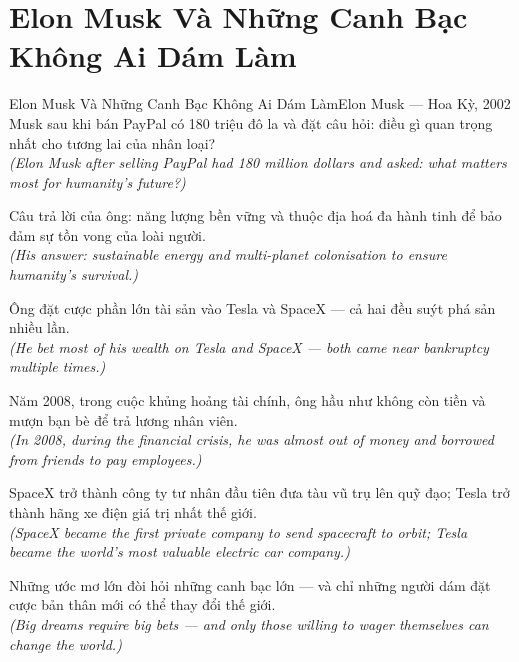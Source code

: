 \section{Elon Musk Và Những Canh Bạc Không Ai Dám Làm}
\begin{truyen}{Elon Musk Và Những Canh Bạc Không Ai Dám Làm}{Elon Musk --- Hoa Kỳ, 2002}
 Musk sau khi bán PayPal có 180 triệu đô la và đặt câu hỏi: điều gì quan trọng nhất cho tương lai của nhân loại?\\[4pt]
\textit{(Elon Musk after selling PayPal had 180 million dollars and asked: what matters most for humanity's future?)}

Câu trả lời của ông: năng lượng bền vững và thuộc địa hoá đa hành tinh để bảo đảm sự tồn vong của loài người.\\[4pt]
\textit{(His answer: sustainable energy and multi-planet colonisation to ensure humanity's survival.)}

Ông đặt cược phần lớn tài sản vào Tesla và SpaceX --- cả hai đều suýt phá sản nhiều lần.\\[4pt]
\textit{(He bet most of his wealth on Tesla and SpaceX --- both came near bankruptcy multiple times.)}

Năm 2008, trong cuộc khủng hoảng tài chính, ông hầu như không còn tiền và mượn bạn bè để trả lương nhân viên.\\[4pt]
\textit{(In 2008, during the financial crisis, he was almost out of money and borrowed from friends to pay employees.)}

SpaceX trở thành công ty tư nhân đầu tiên đưa tàu vũ trụ lên quỹ đạo; Tesla trở thành hãng xe điện giá trị nhất thế giới.\\[4pt]
\textit{(SpaceX became the first private company to send spacecraft to orbit; Tesla became the world's most valuable electric car company.)}

\end{truyen}
\begin{baihoc}
  Những ước mơ lớn đòi hỏi những canh bạc lớn --- và chỉ những người dám đặt cược bản thân mới có thể thay đổi thế giới.\\[4pt]
  \textit{(Big dreams require big bets --- and only those willing to wager themselves can change the world.)}
\end{baihoc}

